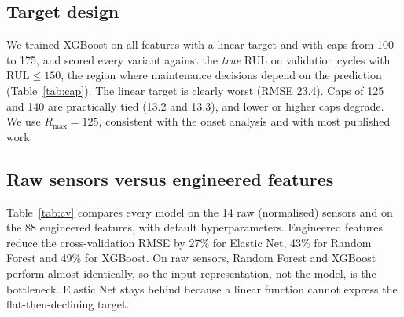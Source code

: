 \documentclass[conference]{IEEEtran}
\begin{document}
\subsection{Target design}\label{sec:cap}
We trained XGBoost on all features with a linear target and with caps from 100 to 175, and scored every variant against the \emph{true} RUL on validation cycles with $\text{RUL}\le150$, the region where maintenance decisions depend on the prediction (Table~\ref{tab:cap}). The linear target is clearly worst (RMSE 23.4). Caps of 125 and 140 are practically tied (13.2 and 13.3), and lower or higher caps degrade. We use $R_{\max}=125$, consistent with the onset analysis and with most published work.

\begin{table}[t]
\centering
\small
\setlength{\tabcolsep}{4pt}
\caption{Effect of the RUL cap (XGBoost, 5-fold CV, scored against true RUL)}
\label{tab:cap}
\end{table}

\subsection{Raw sensors versus engineered features}
Table~\ref{tab:cv} compares every model on the 14 raw (normalised) sensors and on the 88 engineered features, with default hyperparameters. Engineered features reduce the cross-validation RMSE by 27\% for Elastic Net, 43\% for Random Forest and 49\% for XGBoost. On raw sensors, Random Forest and XGBoost perform almost identically, so the input representation, not the model, is the bottleneck. Elastic Net stays behind because a linear function cannot express the flat-then-declining target.
\end{document}

